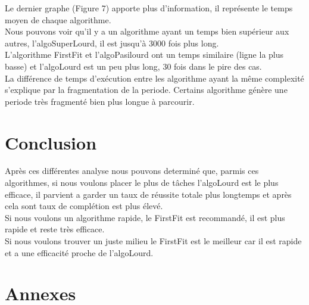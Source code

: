 \documentclass[11pt]{article}
\begin{document}
Le dernier graphe (Figure 7) apporte plus d'information, il représente le temps moyen de chaque algorithme.\\
Nous pouvons voir qu'il y a un algorithme ayant un temps bien supérieur aux autres, l'algoSuperLourd, il est jusqu'à 3000 fois plus long.\\
L'algorithme FirstFit et l'algoPasilourd ont un temps similaire (ligne la plus basse) et l'algoLourd est un peu plus long, 30 fois dans le pire des cas.\\
La différence de temps d'exécution entre les algorithme ayant la même complexité s'explique par la fragmentation de la periode. Certains algorithme génère une periode très fragmenté bien plus longue à parcourir.

\newpage
\section{Conclusion}

Après ces différentes analyse nous pouvons determiné que, parmis ces algorithmes, si nous voulons placer le plus de tâches l'algoLourd est le plus efficace, il parvient a garder un taux de réussite totale plus longtemps et après cela sont taux de complétion est plus élevé.\\
Si nous voulons un algorithme rapide, le FirstFit est recommandé, il est plus rapide et reste très efficace.\\
Si nous voulons trouver un juste milieu le FirstFit est le meilleur car il est rapide et a une efficacité proche de l'algoLourd.

\newpage
\section{Annexes}
\end{document}
